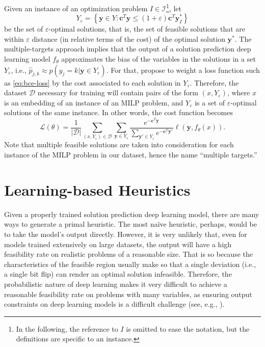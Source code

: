 Given an instance of an optimization problem $I\in \mathcal{I}$\footnote{In the following, the reference to $I$ is omitted to ease the notation, but the definitions are specific to an instance.}, let \[
Y_\varepsilon = \left\{ \bm{y} \in Y: \bm{c}^T\bm{y} \le \allowbreak (1+\varepsilon) \bm{c}^T\bm{y}^*_{I} \right\}
\] be the set of $\varepsilon$-optimal solutions, that is, the set of feasible solutions that are within $\varepsilon$ distance (in relative terms of the cost) of the optimal solution $\bm{y}^*$.
The multiple-targets approach implies that the output of a solution prediction deep learning model $f_{\theta}$ approximates the bias of the variables in the solutions in a set $Y_\varepsilon$, i.e., $\hat{p}_{j,k} \approx p(y_j = k | \bm{y} \in Y_\varepsilon)$.
For that,  propose to weight a loss function such as \eqref{eq:bce-loss} by the cost associated to each solution in $Y_\varepsilon$.
Therefore, the dataset $\mathcal{D}$ necessary for training will contain pairs of the form $(x,Y_\varepsilon)$, where $x$ is an embedding of an instance of an MILP problem, and $Y_\varepsilon$ is a set of $\varepsilon$-optimal solutions of the same instance.
In other words, the cost function becomes \[
    \mathcal{L}(\theta) = \frac{1}{|\mathcal{D}|} \sum_{(x,Y_\varepsilon)\in \mathcal{D}} \sum_{\bm{y}\in Y_\varepsilon}  \frac{e^{-\bm{c}^T \bm{y}}}{\sum_{\bm{y}'\in Y_\varepsilon} e^{-\bm{c}^T \bm{y}'}} \ell(\bm{y},f_\theta(x))
.\] Note that multiple feasible solutions are taken into consideration for each instance of the MILP problem in our dataset, hence the name ``multiple targets.''

\section{Learning-based Heuristics}\label{sec:learning-based-heuristics}

Given a properly trained solution prediction deep learning model, there are many ways to generate a primal heuristic.
The most naïve heuristic, perhaps, would be to take the model's output directly.
However, it is very unlikely that, even for models trained extensively on large datasets, the output will have a high feasibility rate on realistic problems of a reasonable size.
That is so because the characteristics of the feasible region usually make so that a single deviation (i.e., a single bit flip) can render an optimal solution infeasible.
Therefore, the probabilistic nature of deep learning makes it very difficult to achieve a reasonable feasibility rate on problems with many variables, as ensuring output constraints on deep learning models is a difficult challenge (see, e.g., ).

